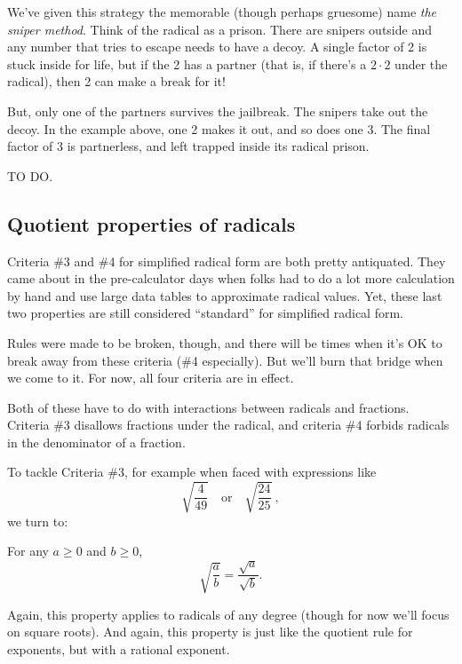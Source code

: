 We've given this strategy the memorable (though perhaps gruesome) name \textit{the sniper method}. Think of the radical as a prison. There are snipers outside and any number that tries to escape needs to have a decoy. A single factor of 2 is stuck inside for life, but if the 2 has a partner (that is, if there's a $2 \cdot 2$ under the radical), then 2 can make a break for it!

But, only one of the partners survives the jailbreak. The snipers take out the decoy. In the example above, one 2 makes it out, and so does one 3. The final factor of 3 is partnerless, and left trapped inside its radical prison.

\begin{boxedex}
	TO DO.
\end{boxedex}

\subsection{Quotient properties of radicals}
\label{sec:radquotient}

Criteria \#3 and \#4 for simplified radical form are both pretty antiquated. They came about in the pre-calculator days when folks had to do a lot more calculation by hand and use large data tables to approximate radical values. Yet, these last two properties are still considered ``standard'' for simplified radical form.

Rules were made to be broken, though, and there will be times when it's OK to break away from these criteria (\#4 especially). But we'll burn that bridge when we come to it. For now, all four criteria are in effect.

Both of these have to do with interactions between radicals and fractions. Criteria \#3 disallows fractions under the radical, and criteria \#4 forbids radicals in the denominator of a fraction.

To tackle Criteria \#3, for example when faced with expressions like \[\sqrt{\frac{4}{49}} \quad\text{or}\quad \sqrt{\frac{24}{25}}~,\]we turn to:

\begin{boxeddef}
For any $a \geq 0$ and $b \geq 0$, \[\sqrt{\frac{a}{b}} = \dfrac{\sqrt{a}}{\sqrt{b}}.\]
\end{boxeddef}

Again, this property applies to radicals of any degree (though for now we'll focus on square roots). And again, this property is just like the quotient rule for exponents, but with a rational exponent.

